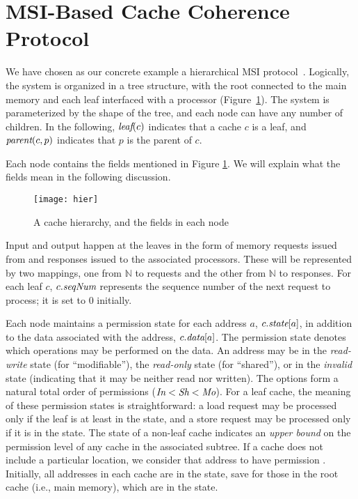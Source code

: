 \section{MSI-Based Cache Coherence Protocol}
\label{sec:System}

We have chosen as our concrete example a hierarchical MSI
protocol~\cite{MSI}. Logically, the system is organized in a tree
structure, with the root connected to the main memory and each leaf interfaced
with a processor (Figure~\ref{hier}). The system is parameterized by the shape
of the tree, and each node can have any number of children.
In the following, $\textit{leaf}(c)$ indicates
that a cache $c$ is a leaf, and $\textit{parent}(c,p)$ indicates that $p$ is the parent of
$c$.

Each node contains the fields mentioned in Figure \ref{hier}. We will
explain what the fields mean in the following discussion.

\begin{figure}
\centering
\texttt{[image: hier]}
\caption{A cache hierarchy, and the fields in each node}
\label{hier}
\end{figure}

Input and output happen at the leaves in the form of memory requests
issued from and responses issued to the associated processors. These will be
represented by two mappings, one from $\mathbb{N}$ to requests and the other
from $\mathbb{N}$ to responses. For each leaf $c$, $c.\textit{seqNum}$ represents the
sequence number of the next request to process; it is set to $0$ initially.

Each node maintains a permission state for each address $a$, $c.\textit{state}[a]$, in
addition to the data associated with the address, $c.\textit{data}[a]$. The permission
state denotes which operations may be performed on the data. An address may be
in the \emph{read-write} state \Mo{} (for ``modifiable''),
the \emph{read-only} state \Sh{} (for ``shared''), or in the \emph{invalid} state
\In{} (indicating that it may be neither read nor written). The options form a natural
total order of permissions ($\textit{In} < \textit{Sh} < \textit{Mo}$). For a leaf cache, the meaning
of these permission states is straightforward: a load request may be processed
only if the leaf is at least in the \Sh{} state, and a store request may be
processed only if it is in the \Mo{} state. The state of a non-leaf cache indicates
an \emph{upper bound} on the permission level of any cache in the associated subtree.
If a cache does not include a particular location,
we consider that address to have permission \In.  Initially, all addresses in
each cache are in the \In{} state, save for those in the root cache (i.e., main memory),
which are in the \Mo{} state.

